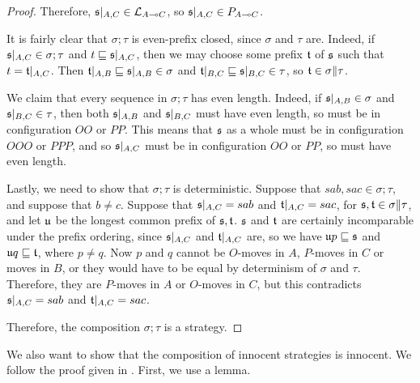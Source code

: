 \documentclass[11pt]{report}
\begin{document}
\begin{proof}
  Therefore, $\mathfrak s\vert_{A,C}\in \mathcal L_{A\multimap C}$, so $\mathfrak s\vert_{A,C}\in P_{A\multimap C}$.

  It is fairly clear that $\sigma;\tau$ is even-prefix closed, since $\sigma$ and $\tau$ are.  
  Indeed, if $\mathfrak s\vert_{A,C}\in\sigma;\tau$ and $t\sqsubseteq\mathfrak s\vert_{A,C}$, then we may choose some prefix $\mathfrak t$ of $\mathfrak s$ such that $t=\mathfrak t\vert_{A,C}$.  
  Then $\mathfrak t\vert_{A,B}\sqsubseteq\mathfrak s\vert_{A,B}\in\sigma$ and $\mathfrak t\vert_{B,C}\sqsubseteq\mathfrak s\vert_{B,C}\in\tau$, so $\mathfrak t\in\sigma\|\tau$.

  We claim that every sequence in $\sigma;\tau$ has even length.  
  Indeed, if $\mathfrak s\vert_{A,B}\in\sigma$ and $\mathfrak s\vert_{B,C}\in\tau$, then both $\mathfrak s\vert_{A,B}$ and $\mathfrak s\vert_{B,C}$ must have even length, so must be in configuration $OO$ or $PP$.  
  This means that $\mathfrak s$ as a whole must be in configuration $OOO$ or $PPP$, and so $\mathfrak s\vert_{A,C}$ must be in configuration $OO$ or $PP$, so must have even length.

  Lastly, we need to show that $\sigma;\tau$ is deterministic.  
  Suppose that $sab,sac\in\sigma;\tau$, and suppose that $b\ne c$.  
  Suppose that $\mathfrak s\vert_{A,C}=sab$ and $\mathfrak t\vert_{A,C}=sac$, for $\mathfrak s,\mathfrak t\in\sigma\|\tau$, and let $\mathfrak u$ be the longest common prefix of $\mathfrak s,\mathfrak t$.
  $\mathfrak s$ and $\mathfrak t$ are certainly incomparable under the prefix ordering, since $\mathfrak s\vert_{A,C}$ and $\mathfrak t\vert_{A,C}$ are, so we have $\mathfrak u p\sqsubseteq \mathfrak s$ and $\mathfrak u q\sqsubseteq \mathfrak t$, where $p\ne q$.
  Now $p$ and $q$ cannot be $O$-moves in $A$, $P$-moves in $C$ or moves in $B$, or they would have to be equal by determinism of $\sigma$ and $\tau$.  
  Therefore, they are $P$-moves in $A$ or $O$-moves in $C$, but this contradicts $\mathfrak s\vert_{A,C}=sab$ and $\mathfrak t\vert_{A,C}=sac$.

  Therefore, the composition $\sigma;\tau$ is a strategy.  
\end{proof}

We also want to show that the composition of innocent strategies is innocent.
We follow the proof given in \cite{Harmer2006InnocentGS}.  
First, we use a lemma.
\end{document}
